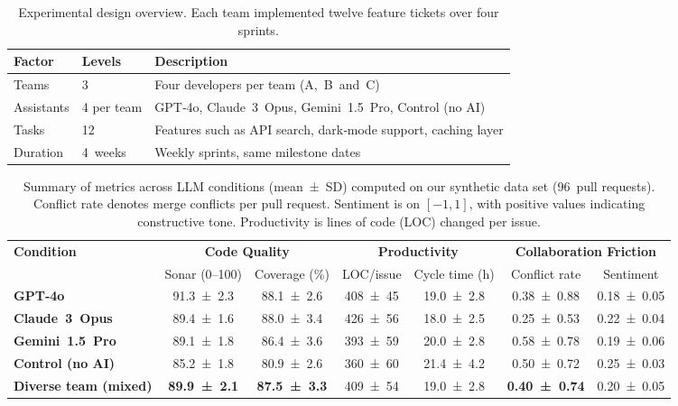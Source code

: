 \documentclass[conference]{IEEEtran}
\begin{document}
\smallskip


\begin{table}[t]
\centering
\caption{Experimental design overview.  Each team implemented twelve feature tickets over four sprints.}
\label{tab:design}
\begin{tabular}{p{2.5cm}p{2cm}p{3cm}}
\toprule
\textbf{Factor} & \textbf{Levels} & \textbf{Description}\\
\midrule
Teams & 3 & Four developers per team (A, B and C) \\
Assistants & 4 per team & GPT‑4o, Claude 3 Opus, Gemini 1.5 Pro, Control (no AI) \\
Tasks & 12 & Features such as API search, dark‑mode support, caching layer \\
Duration & 4 weeks & Weekly sprints, same milestone dates \\
\bottomrule
\end{tabular}
\end{table}

\begin{table*}[t]
\centering
\caption{Summary of metrics across LLM conditions (mean ± SD) computed on our synthetic data set (96 pull requests).  Conflict rate denotes merge conflicts per pull request.  Sentiment is on $[-1,1]$, with positive values indicating constructive tone.  Productivity is lines of code (LOC) changed per issue.}
\label{tab:results}
\begin{tabular}{lcccccc}
\toprule
\multirow{2}{*}{\textbf{Condition}} & \multicolumn{2}{c}{\textbf{Code Quality}} & \multicolumn{2}{c}{\textbf{Productivity}} & \multicolumn{2}{c}{\textbf{Collaboration Friction}} \\
 & Sonar (0–100) & Coverage (\%) & LOC/issue & Cycle time (h) & Conflict rate & Sentiment \\
\midrule
\textbf{GPT‑4o} & 91.3 ± 2.3 & 88.1 ± 2.6 & 408 ± 45 & 19.0 ± 2.8 & 0.38 ± 0.88 & 0.18 ± 0.05 \\
\textbf{Claude 3 Opus} & 89.4 ± 1.6 & 88.0 ± 3.4 & 426 ± 56 & 18.0 ± 2.5 & 0.25 ± 0.53 & 0.22 ± 0.04 \\
\textbf{Gemini 1.5 Pro} & 89.1 ± 1.8 & 86.4 ± 3.6 & 393 ± 59 & 20.0 ± 2.8 & 0.58 ± 0.78 & 0.19 ± 0.06 \\
\textbf{Control (no AI)} & 85.2 ± 1.8 & 80.9 ± 2.6 & 360 ± 60 & 21.4 ± 4.2 & 0.50 ± 0.72 & 0.25 ± 0.03 \\
\midrule
\textbf{Diverse team (mixed)} & \textbf{89.9 ± 2.1} & \textbf{87.5 ± 3.3} & 409 ± 54 & 19.0 ± 2.8 & \textbf{0.40 ± 0.74} & 0.20 ± 0.05 \\
\bottomrule
\end{tabular}
\end{table*}
\end{document}
